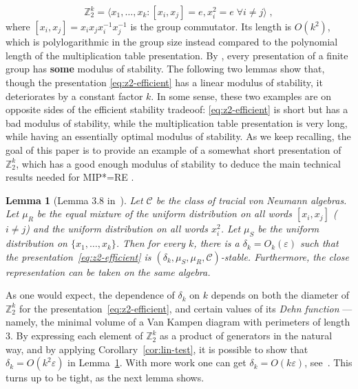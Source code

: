 \documentclass[11pt]{article}
\newtheorem{lemma}[theorem]{Lemma}
\theoremstyle{definition}
\newcommand{\Z}{\ensuremath{\mathbb{Z}}}
\newcommand{\mC}{\ensuremath{\mathcal{C}}}
\newcommand{\eps}{\varepsilon}
\begin{document}
\begin{equation}\label{eq:z2-efficient}
 \Z_2^k = \langle x_1,\ldots,x_k : [x_i,x_j]=e, x_i^2=e \; \forall i\neq j \rangle\;,
\end{equation}
where $[x_i,x_j]=x_ix_jx_i^{-1}x_j^{-1}$ is the group commutator. 
Its length is $O(k^2)$, which is polylogarithmic in the group size instead compared to the polynomial length of the multiplication table presentation. By \cite{hadwin2018stability}, every presentation of a finite group has \textbf{some} modulus of stability.
The following two lemmas show that, though the presentation \eqref{eq:z2-efficient} has a linear modulus of stability, it deteriorates by a constant factor $k$. In some sense, these two examples are on opposite sides of the efficient stability tradeoof: \eqref{eq:z2-efficient} is short but has a bad modulus of stability, while the multiplication table presentation is very long, while having an essentially optimal modulus of stability. As we keep recalling, the goal of this paper is to provide an example of a somewhat short presentation of $\Z_2^k$, which has a good enough modulus of stability to deduce the main technical results needed for MIP*=RE \cite{ji2020mip}.



\begin{lemma}[Lemma 3.8 in~\cite{slofstra2019set}]\label{lem:eff-z2}
Let $\mC$ be the class of tracial von Neumann algebras. Let $\mu_R$ be the equal mixture of the uniform distribution on all words $[x_i,x_j]$ ($i\neq j$) and the uniform distribution on all words $x_i^2$. Let $\mu_S$ be the uniform distribution on $\{x_1,\ldots,x_k\}$. Then 
  for every $k$, there is a $\delta_k = O_k(\eps)$ such that the presentation~\eqref{eq:z2-efficient} is $(\delta_k,\mu_S,\mu_R,\mC)$-stable. Furthermore, the close representation can be taken on the same algebra.
\end{lemma}

As one would expect, the dependence of $\delta_k$ on $k$ depends on both the diameter of $\Z_2^k$ for the presentation~\eqref{eq:z2-efficient}, and certain values of its \emph{Dehn function} --- namely, the minimal volume of a Van Kampen diagram with perimeters of length $3$. By expressing each element of $\Z_2^k$ as a product of generators in the natural way, and by applying Corollary~\ref{cor:lin-test}, it is possible to show that $\delta_k=O(k^2\eps)$ in Lemma~\ref{lem:eff-z2}. With more work one can get $\delta_k=O(k\eps)$, see~\cite[Theorem 3.2]{chao2017overlapping}. This turns up to be  tight, as the next lemma shows. 
\end{document}
